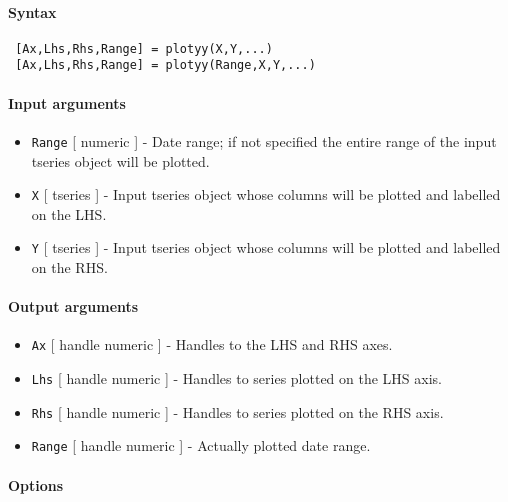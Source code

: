 


	\paragraph{Syntax}
 
 \begin{verbatim}
 [Ax,Lhs,Rhs,Range] = plotyy(X,Y,...)
 [Ax,Lhs,Rhs,Range] = plotyy(Range,X,Y,...)
 \end{verbatim}
 
 \paragraph{Input arguments}
 
 \begin{itemize}
 \item
   \texttt{Range} {[} numeric {]} - Date range; if not specified the
   entire range of the input tseries object will be plotted.
 \item
   \texttt{X} {[} tseries {]} - Input tseries object whose columns will
   be plotted and labelled on the LHS.
 \item
   \texttt{Y} {[} tseries {]} - Input tseries object whose columns will
   be plotted and labelled on the RHS.
 \end{itemize}
 
 \paragraph{Output arguments}
 
 \begin{itemize}
 \item
   \texttt{Ax} {[} handle \textbar{} numeric {]} - Handles to the LHS and
   RHS axes.
 \item
   \texttt{Lhs} {[} handle \textbar{} numeric {]} - Handles to series
   plotted on the LHS axis.
 \item
   \texttt{Rhs} {[} handle \textbar{} numeric {]} - Handles to series
   plotted on the RHS axis.
 \item
   \texttt{Range} {[} handle \textbar{} numeric {]} - Actually plotted
   date range.
 \end{itemize}
 
 \paragraph{Options}
 
